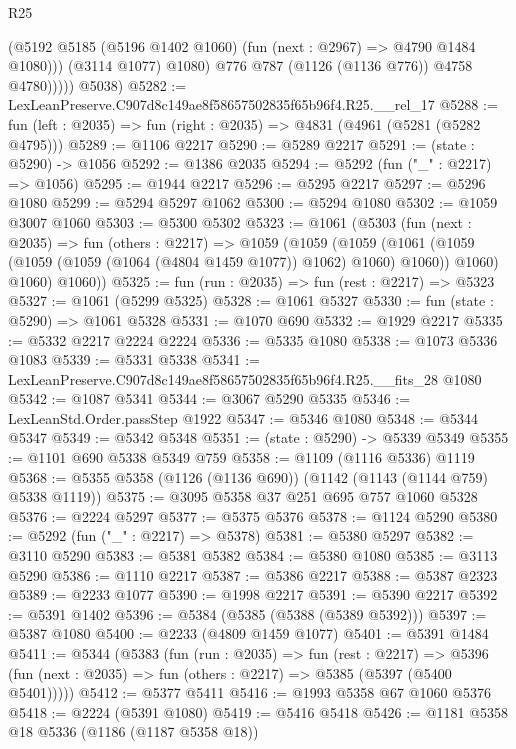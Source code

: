 \begin{lexlean}{R25}
\begin{coremodule}
                    (@5192 @5185 (@5196 @1402 @1060) (fun (next : @2967) => @4790 @1484 @1080)))
                  (@3114 @1077)
                  @1080)
                @776
                @787
                (@1126 (@1136 @776))
                @4758
                @4780)))))
      @5038)
@5282 := LexLeanPreserve.C907d8c149ae8f58657502835f65b96f4.R25.__rel_17
@5288 := fun (left : @2035) => fun (right : @2035) => @4831 (@4961 (@5281 (@5282 @4795)))
@5289 := @1106 @2217
@5290 := @5289 @2217
@5291 := (state : @5290) -> @1056
@5292 := @1386 @2035
@5294 := @5292 (fun ("_" : @2217) => @1056)
@5295 := @1944 @2217
@5296 := @5295 @2217
@5297 := @5296 @1080
@5299 := @5294 @5297 @1062
@5300 := @5294 @1080
@5302 := @1059 @3007 @1060
@5303 := @5300 @5302
@5323 := @1061
    (@5303
      (fun (next : @2035) =>
      fun (others : @2217) =>
      @1059
        (@1059
          (@1059
            (@1061 (@1059 (@1059 (@1059 (@1064 (@4804 @1459 @1077)) @1062) @1060) @1060))
            @1060)
          @1060)
        @1060))
@5325 := fun (run : @2035) => fun (rest : @2217) => @5323
@5327 := @1061 (@5299 @5325)
@5328 := @1061 @5327
@5330 := fun (state : @5290) => @1061 @5328
@5331 := @1070 @690
@5332 := @1929 @2217
@5335 := @5332 @2217 @2224 @2224
@5336 := @5335 @1080
@5338 := @1073 @5336 @1083
@5339 := @5331 @5338
@5341 := LexLeanPreserve.C907d8c149ae8f58657502835f65b96f4.R25.__fits_28 @1080
@5342 := @1087 @5341
@5344 := @3067 @5290 @5335
@5346 := LexLeanStd.Order.passStep @1922
@5347 := @5346 @1080
@5348 := @5344 @5347
@5349 := @5342 @5348
@5351 := (state : @5290) -> @5339 @5349
@5355 := @1101 @690 @5338 @5349 @759
@5358 := @1109 (@1116 @5336) @1119
@5368 := @5355 @5358 (@1126 (@1136 @690)) (@1142 (@1143 (@1144 @759) @5338 @1119))
@5375 := @3095 @5358 @37 @251 @695 @757 @1060 @5328
@5376 := @2224 @5297
@5377 := @5375 @5376
@5378 := @1124 @5290
@5380 := @5292 (fun ("_" : @2217) => @5378)
@5381 := @5380 @5297
@5382 := @3110 @5290
@5383 := @5381 @5382
@5384 := @5380 @1080
@5385 := @3113 @5290
@5386 := @1110 @2217
@5387 := @5386 @2217
@5388 := @5387 @2323
@5389 := @2233 @1077
@5390 := @1998 @2217
@5391 := @5390 @2217
@5392 := @5391 @1402
@5396 := @5384 (@5385 (@5388 (@5389 @5392)))
@5397 := @5387 @1080
@5400 := @2233 (@4809 @1459 @1077)
@5401 := @5391 @1484
@5411 := @5344
    (@5383
      (fun (run : @2035) =>
      fun (rest : @2217) =>
      @5396 (fun (next : @2035) => fun (others : @2217) => @5385 (@5397 (@5400 @5401)))))
@5412 := @5377 @5411
@5416 := @1993 @5358 @67 @1060 @5376
@5418 := @2224 (@5391 @1080)
@5419 := @5416 @5418
@5426 := @1181 @5358 @18 @5336 (@1186 (@1187 @5358 @18))

\end{coremodule}
\end{lexlean}
